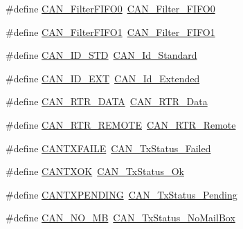 \begin{DoxyCompactItemize}
\item 
\#define \hyperlink{group___c_a_n___legacy_ga1b3d041dff9fed4dad75ed2a4a0e27e0}{C\+A\+N\+\_\+\+Filter\+F\+I\+F\+O0}~\hyperlink{group___c_a_n__filter___f_i_f_o_ga8249c27978ca94676530540b88a6be8f}{C\+A\+N\+\_\+\+Filter\+\_\+\+F\+I\+F\+O0}
\item 
\#define \hyperlink{group___c_a_n___legacy_gada8f9b3a9c88f36539aaeb457039e666}{C\+A\+N\+\_\+\+Filter\+F\+I\+F\+O1}~\hyperlink{group___c_a_n__filter___f_i_f_o_gaab8478c89a607c4b8baf68efc730e316}{C\+A\+N\+\_\+\+Filter\+\_\+\+F\+I\+F\+O1}
\item 
\#define \hyperlink{group___c_a_n___legacy_ga284ca16658deb9d0c21f4ddc6db14833}{C\+A\+N\+\_\+\+I\+D\+\_\+\+S\+TD}~\hyperlink{group___c_a_n__identifier__type_ga151d9df8a6f361d0a3231593726b5a13}{C\+A\+N\+\_\+\+Id\+\_\+\+Standard}
\item 
\#define \hyperlink{group___c_a_n___legacy_ga5f6fdd1dc3d312af1ac30e2eee15d6f0}{C\+A\+N\+\_\+\+I\+D\+\_\+\+E\+XT}~\hyperlink{group___c_a_n__identifier__type_gaf6c5c0b43b968fed17fd90246912b1a7}{C\+A\+N\+\_\+\+Id\+\_\+\+Extended}
\item 
\#define \hyperlink{group___c_a_n___legacy_gab1e89074b4fcfebf81c323909625b0d0}{C\+A\+N\+\_\+\+R\+T\+R\+\_\+\+D\+A\+TA}~\hyperlink{group___c_a_n__remote__transmission__request_ga2407c3a8b2cd97bd651143aa959219f1}{C\+A\+N\+\_\+\+R\+T\+R\+\_\+\+Data}
\item 
\#define \hyperlink{group___c_a_n___legacy_gab15c649e3e497c6d1145bb98ff7f3f04}{C\+A\+N\+\_\+\+R\+T\+R\+\_\+\+R\+E\+M\+O\+TE}~\hyperlink{group___c_a_n__remote__transmission__request_ga42e95ddfb02d88c82de84058fb0fb349}{C\+A\+N\+\_\+\+R\+T\+R\+\_\+\+Remote}
\item 
\#define \hyperlink{group___c_a_n___legacy_gae315f7ee14af20ca8454be9e507873cd}{C\+A\+N\+T\+X\+F\+A\+I\+LE}~\hyperlink{group___c_a_n__transmit__constants_ga8d193002e76c04ec8caff6b110cd5983}{C\+A\+N\+\_\+\+Tx\+Status\+\_\+\+Failed}
\item 
\#define \hyperlink{group___c_a_n___legacy_ga288ba42cf1de7572f2fe1378268c9452}{C\+A\+N\+T\+X\+OK}~\hyperlink{group___c_a_n__transmit__constants_ga0b401c61922b1449de9b486dcf475c97}{C\+A\+N\+\_\+\+Tx\+Status\+\_\+\+Ok}
\item 
\#define \hyperlink{group___c_a_n___legacy_ga76f43f4c54505b1f87b39b056ca38897}{C\+A\+N\+T\+X\+P\+E\+N\+D\+I\+NG}~\hyperlink{group___c_a_n__transmit__constants_ga9678a3a51379422868083608c7394409}{C\+A\+N\+\_\+\+Tx\+Status\+\_\+\+Pending}
\item 
\#define \hyperlink{group___c_a_n___legacy_ga418f1fd7ca2e852b263fd07874fde0c6}{C\+A\+N\+\_\+\+N\+O\+\_\+\+MB}~\hyperlink{group___c_a_n__transmit__constants_ga2620e99debd51011d3569121f2e44690}{C\+A\+N\+\_\+\+Tx\+Status\+\_\+\+No\+Mail\+Box}

\end{DoxyCompactItemize}
